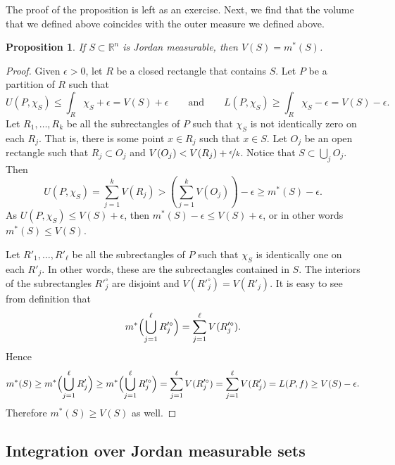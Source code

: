 \documentclass[12pt]{book}
\newcommand{\R}{{\mathbb{R}}}
\theoremstyle{plain}
\newtheorem{prop}[thm]{Proposition}
\theoremstyle{remark}
\theoremstyle{definition}
\theoremstyle{exercise}
\theoremstyle{example}
\begin{document}
The proof of the proposition is left as an exercise.
Next, we find that the volume that we defined above coincides with the outer
measure we defined above.

\begin{prop}
If $S \subset \R^n$ is Jordan measurable, then $V(S) = m^*(S)$.
\end{prop}

\begin{proof}
Given $\epsilon > 0$,
let $R$ be a closed rectangle that contains $S$.  Let $P$ be a partition
of $R$ such that 
\begin{equation*}
U(P,\chi_S) \leq \int_R \chi_S + \epsilon = V(S) + \epsilon
\qquad \text{and} \qquad
L(P,\chi_S) \geq \int_R \chi_S - \epsilon = V(S)-\epsilon.
\end{equation*}
Let $R_1,\ldots,R_k$ be all the subrectangles of $P$ such that $\chi_S$ is not
identically zero on each $R_j$.  That is, there is some point $x \in R_j$ such
that $x \in S$.  Let $O_j$ be an open rectangle such that $R_j \subset O_j$
and $V(O_j) < V(R_j) + \nicefrac{\epsilon}{k}$.  Notice that $S \subset
\bigcup_j O_j$.  Then
\begin{equation*}
U(P,\chi_S) = \sum_{j=1}^k V(R_j) > 
\left(\sum_{j=1}^k V(O_j)\right) - \epsilon \geq m^*(S) - \epsilon .
\end{equation*}
As 
$U(P,\chi_S) \leq V(S) + \epsilon$, then
$m^*(S) - \epsilon \leq V(S) + \epsilon$, or in other words
$m^*(S) \leq V(S)$.

Let $R'_1,\ldots,R'_\ell$ be all the subrectangles of $P$ such that
$\chi_S$ is identically one on each $R'_j$.  In other words,
these are the subrectangles contained in $S$.
  The interiors
of the subrectangles $R'^\circ_j$ are disjoint and
$V(R'^\circ_j) = V(R'_j)$.  It is easy to see from definition
that 
\begin{equation*}
m^*\Bigl(\bigcup_{j=1}^\ell R'^\circ_j\Bigr)
=
\sum_{j=1}^\ell
V(R'^\circ_j) .
\end{equation*}
Hence
\begin{equation*}
m^*(S) \geq
m^*\Bigl(\bigcup_{j=1}^\ell R'_j\Bigr)
\geq
m^*\Bigl(\bigcup_{j=1}^\ell R'^\circ_j\Bigr)
=
\sum_{j=1}^\ell
V(R'^\circ_j)
=
\sum_{j=1}^\ell
V(R'_j)
=
L(P,f) \geq V(S) - \epsilon .
\end{equation*}
Therefore $m^*(S) \geq V(S)$ as well.
\end{proof}

\subsection{Integration over Jordan measurable sets}
\end{document}

